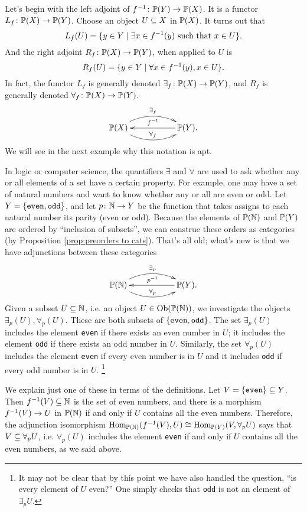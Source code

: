\documentclass[CT4S-EN-RU]{subfiles}
\begin{document}
\begin{blockRUS}
\end{blockRUS}

\begin{blockENG}
Let's begin with the left adjoint of $f^\m1\taking\PP(Y)\to\PP(X)$. It is a functor $L_f\taking\PP(X)\to\PP(Y)$. Choose an object $U\ss X$ in $\PP(X)$. It turns out that
$$L_f(U)=\{y\in Y\|\exists x\in f^\m1(y)\tn{ such that }x\in U\}.$$
And the right adjoint $R_f\taking\PP(X)\to\PP(Y)$, when applied to $U$ is 
$$R_f(U)=\{y\in Y\|\forall x\in f^\m1(y), x\in U\}.$$
In fact, the functor $L_f$ is generally denoted $\exists_f\taking\PP(X)\to\PP(Y)$, and $R_f$ is generally denoted $\forall_f\taking\PP(X)\to\PP(Y)$. 
$$
\xymatrix{\PP(X)\ar@/^1.2pc/[rr]^{\exists_f}\ar@/_1.2pc/[rr]^{\forall_f}&&\PP(Y)\ar[ll]_{f^\m1}.}
$$
We will see in the next example why this notation is apt.
\end{blockENG}

\begin{blockRUS}
\end{blockRUS}

\begin{exampleENG}
In logic or computer science, the quantifiers $\exists$ and $\forall$ are used to ask whether any or all elements of a set have a certain property. For example, one may have a set of natural numbers and want to know whether any or all are even or odd.
Let $Y=\{{\tt even,odd}\}$, and let $p\taking\NN\to Y$ be the function that takes assigns to each natural number its parity (even or odd). Because the elements of $\PP(\NN)$ and $\PP(Y)$ are ordered by “inclusion of subsets”, we can construe these orders as categories (by Proposition \ref{prop:preorders to cats}). That's all old; what's new is that we have adjunctions between these categories
$$
\xymatrix{\PP(\NN)\ar@/^1.2pc/[rr]^{\exists_p}\ar@/_1.2pc/[rr]^{\forall_p}&&\PP(Y)\ar[ll]_{p^\m1}.}
$$
Given a subset $U\ss\NN$, i.e. an object $U\in\Ob(\PP(\NN))$, we investigate the objects $\exists_p(U),\forall_p(U)$. These are both subsets of $\{{\tt even,odd}\}$. The set $\exists_p(U)$ includes the element {\tt even} if there exists an even number in $U$; it includes the element {\tt odd} if there exists an odd number in $U$. Similarly, the set $\forall_p(U)$ includes the element {\tt even} if every even number is in $U$ and it includes {\tt odd} if every odd number is in $U$.
\footnote{It may not be clear that by this point we have also handled the question, “is every element of $U$ even?” One simply checks that {\tt odd} is not an element of $\exists_pU$.}

We explain just one of these in terms of the definitions. Let $V=\{{\tt even}\}\ss Y$. Then $f^\m1(V)\ss\NN$ is the set of even numbers, and there is a morphism $f^\m1(V)\to U$ in $\PP(\NN)$ if and only if $U$ contains all the even numbers. Therefore, the adjunction isomorphism $\Hom_{\PP(\NN)}(f^\m1(V),U)\iso\Hom_{\PP(Y)}(V,\forall_pU)$ says that $V\ss\forall_pU$, i.e. $\forall_p(U)$ includes the element {\tt even} if and only if $U$ contains all the even numbers, as we said above.
\end{exampleENG}
\end{document}
